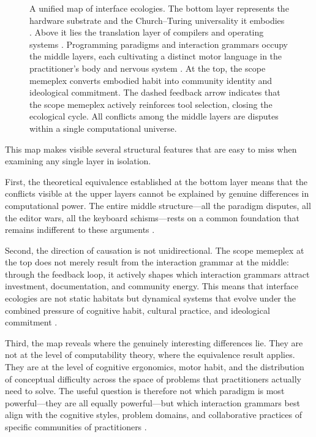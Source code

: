 \documentclass[11pt]{article}
\theoremstyle{definition}
\begin{document}
\begin{figure}[ht]
\begin{tikzpicture}
\end{tikzpicture}
\caption{A unified map of interface ecologies. The bottom layer
represents the hardware substrate and the Church--Turing universality
it embodies \cite{church1936,turing1936,kleene1952}. Above it lies the
translation layer of compilers and operating systems \cite{ritchie1974}.
Programming paradigms and interaction grammars occupy the middle layers,
each cultivating a distinct motor language in the practitioner's body
and nervous system \cite{norman1988}. At the top, the scope memeplex
converts embodied habit into community identity and ideological
commitment. The dashed feedback arrow indicates that the scope memeplex
actively reinforces tool selection, closing the ecological cycle. All
conflicts among the middle layers are disputes within a single
computational universe.}
\label{fig:unified_map}
\end{figure}

This map makes visible several structural features that are easy to miss
when examining any single layer in isolation.

First, the theoretical equivalence established at the bottom layer means
that the conflicts visible at the upper layers cannot be explained by
genuine differences in computational power. The entire middle
structure---all the paradigm disputes, all the editor wars, all the
keyboard schisms---rests on a common foundation that remains indifferent
to these arguments \cite{kleene1952,backus1978}.

Second, the direction of causation is not unidirectional. The scope
memeplex at the top does not merely result from the interaction grammar
at the middle: through the feedback loop, it actively shapes which
interaction grammars attract investment, documentation, and community
energy. This means that interface ecologies are not static habitats but
dynamical systems that evolve under the combined pressure of cognitive
habit, cultural practice, and ideological commitment \cite{brooks1975}.

Third, the map reveals where the genuinely interesting differences lie.
They are not at the level of computability theory, where the equivalence
result applies. They are at the level of cognitive ergonomics, motor
habit, and the distribution of conceptual difficulty across the space of
problems that practitioners actually need to solve. The useful question
is therefore not which paradigm is most powerful---they are all equally
powerful---but which interaction grammars best align with the cognitive
styles, problem domains, and collaborative practices of specific
communities of practitioners \cite{floyd1979,norman1988}.
\end{document}
